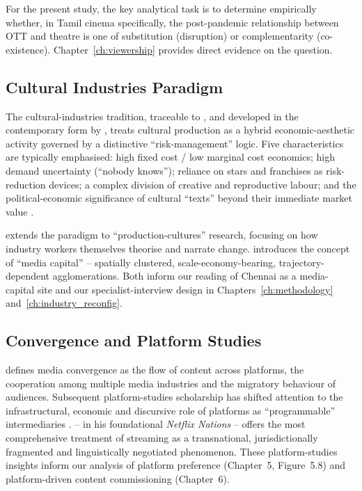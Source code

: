 For the present study, the key analytical task is to determine
empirically whether, in Tamil cinema specifically, the post-pandemic
relationship between OTT and theatre is one of substitution
(disruption) or complementarity (co-existence).
Chapter~\ref{ch:viewership} provides direct evidence on the
question.

\subsection{Cultural Industries Paradigm}
\label{sec:cultural_industries}

The cultural-industries tradition, traceable to \citet{adorno1944},
\citet{garnham1990} and developed in the contemporary form by
\citet{hesmondhalgh2019}, treats cultural production as a hybrid
economic-aesthetic activity governed by a distinctive
``risk-management'' logic.  Five characteristics are typically
emphasised: high fixed cost / low marginal cost economics; high
demand uncertainty (``nobody knows''); reliance on stars and
franchises as risk-reduction devices; a complex division of creative
and reproductive labour; and the political-economic significance of
cultural ``texts'' beyond their immediate market value
\citep{caves2000,deuze2007,deyandolf2014}.

\citet{caldwell2008} extends the paradigm to ``production-cultures''
research, focusing on how industry workers themselves theorise and
narrate change.  \citet{curtin2014} introduces the concept of
``media capital'' -- spatially clustered, scale-economy-bearing,
trajectory-dependent agglomerations.  Both inform our reading of
Chennai as a media-capital site and our specialist-interview design
in Chapters~\ref{ch:methodology} and~\ref{ch:industry_reconfig}.

\subsection{Convergence and Platform Studies}
\label{sec:convergence}

\citet{jenkins2006} defines media convergence as the flow of content
across platforms, the cooperation among multiple media industries
and the migratory behaviour of audiences.  Subsequent
platform-studies scholarship \citep{plantin2018,gillespie2018,
nieborg2018} has shifted attention to the infrastructural, economic
and discursive role of platforms as ``programmable'' intermediaries
\citep{vandijck2018}.  \citet{lobato2019} -- in his foundational
\emph{Netflix Nations} -- offers the most comprehensive treatment of
streaming as a transnational, jurisdictionally fragmented and
linguistically negotiated phenomenon.  These platform-studies
insights inform our analysis of platform preference (Chapter~5,
Figure~5.8) and platform-driven content commissioning
(Chapter~6).

